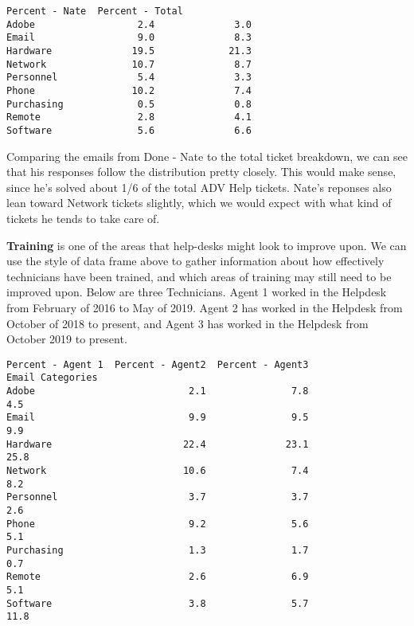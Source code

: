 \documentclass[11pt]{article}
\begin{document}
    \begin{Verbatim}[commandchars=\\\{\}]
            Percent - Nate  Percent - Total
Adobe                  2.4              3.0
Email                  9.0              8.3
Hardware              19.5             21.3
Network               10.7              8.7
Personnel              5.4              3.3
Phone                 10.2              7.4
Purchasing             0.5              0.8
Remote                 2.8              4.1
Software               5.6              6.6

    \end{Verbatim}
 
    Comparing the emails from Done - Nate to the total ticket breakdown, we
can see that his responses follow the distribution pretty closely. This
would make sense, since he's solved about 1/6 of the total ADV Help
tickets. Nate's reponses also lean toward Network tickets slightly,
which we would expect with what kind of tickets he tends to take care
of.


    \textbf{Training} is one of the areas that help-desks might look to
improve upon. We can use the style of data frame above to gather
information about how effectively technicians have been trained, and
which areas of training may still need to be improved upon. Below are
three Technicians. Agent 1 worked in the Helpdesk from February of 2016
to May of 2019. Agent 2 has worked in the Helpdesk from October of 2018
to present, and Agent 3 has worked in the Helpdesk from October 2019 to
present.

    \begin{Verbatim}[commandchars=\\\{\}]
                  Percent - Agent 1  Percent - Agent2  Percent - Agent3
Email Categories
Adobe                           2.1               7.8               4.5
Email                           9.9               9.5               9.9
Hardware                       22.4              23.1              25.8
Network                        10.6               7.4               8.2
Personnel                       3.7               3.7               2.6
Phone                           9.2               5.6               5.1
Purchasing                      1.3               1.7               0.7
Remote                          2.6               6.9               5.1
Software                        3.8               5.7              11.8
    \end{Verbatim}
\end{document}

